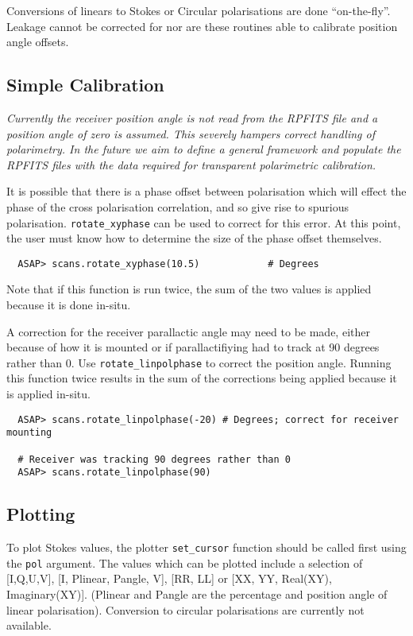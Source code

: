 \documentclass[11pt]{article}
\newcommand{\cmd}[1]{{\tt #1}}
\begin{document}
Conversions of linears to Stokes or Circular polarisations are done
``on-the-fly''. Leakage cannot be corrected for nor are these routines
able to calibrate position angle offsets.

\subsection{Simple Calibration}

{\em Currently the receiver position angle is not read from the RPFITS
file and a position angle of zero is assumed. This severely hampers
correct handling of polarimetry. In the future we aim to define a
general framework and populate the RPFITS files with the data required
for transparent polarimetric calibration.}

It is possible that there is a phase offset between polarisation which
will effect the phase of the cross polarisation correlation, and so give
rise to spurious polarisation. \cmd{rotate\_xyphase} can be used to
correct for this error. At this point, the user must know how to
determine the size of the phase offset themselves.

\begin{verbatim}
  ASAP> scans.rotate_xyphase(10.5)            # Degrees
\end{verbatim}

Note that if this function is run twice, the sum of the two values is
applied because it is done in-situ.

A correction for the receiver parallactic angle may need to be made,
either because of how it is mounted or if parallactifiying had to track
at 90 degrees rather than 0. Use \cmd{rotate\_linpolphase} to correct
the position angle. Running this function twice results in the sum of
the corrections being applied because it is applied in-situ.

\begin{verbatim}
  ASAP> scans.rotate_linpolphase(-20) # Degrees; correct for receiver mounting

  # Receiver was tracking 90 degrees rather than 0
  ASAP> scans.rotate_linpolphase(90)
\end{verbatim}

\subsection{Plotting}
\label{sec:polplot}

To plot Stokes values, the plotter \cmd{set\_cursor} function should
be called first using the \cmd{pol} argument. The values which can be
plotted include a selection of [I,Q,U,V], [I, Plinear, Pangle, V],
[RR, LL] or [XX, YY, Real(XY), Imaginary(XY)]. (Plinear and Pangle are
the percentage and position angle of linear polarisation). Conversion
to circular polarisations are currently not available.
\end{document}
